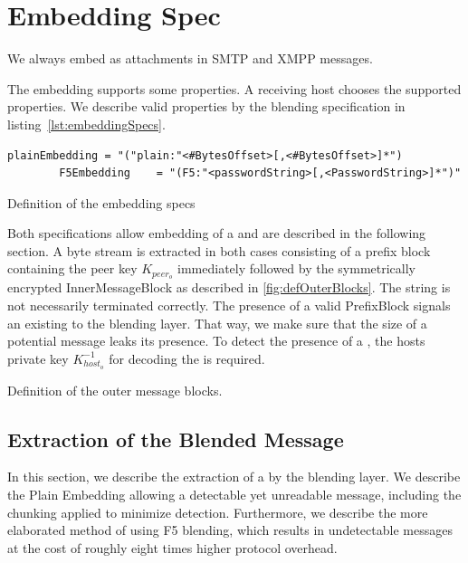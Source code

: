 \section{Embedding Spec}
We always embed \VortexMessages{} as attachments in SMTP and XMPP messages. 

The embedding supports some properties. A receiving host chooses the supported properties. We describe valid properties by the blending specification in listing~\ref{lst:embeddingSpecs}.

\begin{lstfloat}[h!]
	\begin{lstlisting}[language=EBNF]
		plainEmbedding = "("plain:"<#BytesOffset>[,<#BytesOffset>]*")
		F5Embedding    = "(F5:"<passwordString>[,<PasswordString>]*")"
	\end{lstlisting}
	\caption{Definition of the embedding specs}
	\label{lst:embeddingSpecs}
\end{lstfloat}

Both specifications allow embedding of a \VortexMessage{} and are described in the following section. A byte stream is extracted in both cases consisting of a prefix block containing the peer key $K_{peer_o}$ immediately followed by the symmetrically encrypted InnerMessageBlock as described in \cref{fig:defOuterBlocks}. The string is not necessarily terminated correctly. The presence of a valid PrefixBlock signals an existing \VortexMessage{} to the blending layer. That way, we make sure that the size of a potential message leaks its presence. To detect the presence of a \VortexMessage{}, the hosts private key $K^{-1}_{host_o}$ for decoding the is required. 

\begin{lstfloat}[ht]
	
	\caption{Definition of the outer message blocks.}
	\label{fig:defOuterBlocks}
\end{lstfloat}

\subsection{Extraction of the Blended Message}
In this section, we describe the extraction of a \VortexMessage{} by the blending layer. We describe the Plain Embedding allowing a detectable yet unreadable message, including the chunking applied to minimize detection. Furthermore, we describe the more elaborated method of using F5  blending, which results in undetectable messages at the cost of roughly eight times higher protocol overhead.

